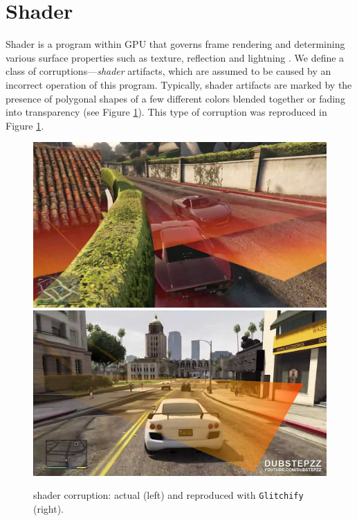 \section*{Shader}
Shader is a program within GPU that governs frame rendering and determining various surface properties such as texture, reflection and lightning \cite{shader}. We define a class of corruptions---\textit{shader} artifacts, which are assumed to be caused by an incorrect operation of this program. Typically, shader artifacts are marked by the presence of polygonal shapes of a few different colors blended together or fading into transparency (see Figure \ref{shader}). This type of corruption was reproduced in Figure \ref{shader}.
\begin{figure}[H]
\centering
\includegraphics[scale=0.135]{images/shader1.png}
\includegraphics[scale=.42]{images/shader2.jpg}
\vspace{5pt}
\caption[shader artifacts]{shader corruption: actual (left) and reproduced with \texttt{Glitchify} (right).}
\label{shader}
\end{figure}
